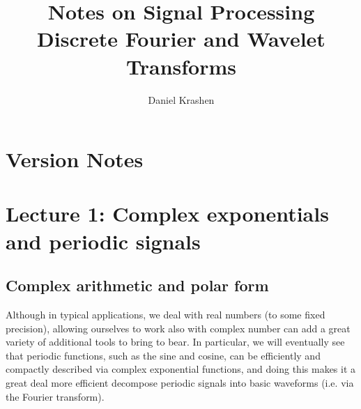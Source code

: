 \documentclass[12pt]{report}
\theoremstyle{plain}
\begin{document}


\author{Daniel Krashen}
\title{Notes on Signal Processing\\Discrete Fourier and Wavelet Transforms}

\maketitle
\tableofcontents


\chapter*{Version Notes}

\iffalse
\section{Updates 1/25/2020}
\begin{itemize}
\item Nothing to say, but generally update information would go here.
\item e.g. added stuff to Section~\ref{lecture 1}
\end{itemize}
\fi

\chapter{Lecture 1: Complex exponentials and periodic signals}

\section{Complex arithmetic and polar form}

Although in typical applications, we deal with real numbers (to some fixed precision), allowing ourselves to work also with complex number can add a great variety of additional tools to bring to bear. In particular, we will eventually see that periodic functions, such as the sine and cosine, can be efficiently and compactly described via complex exponential functions, and doing this makes it a great deal more efficient decompose periodic signals into basic waveforms (i.e. via the Fourier transform).
\end{document}
